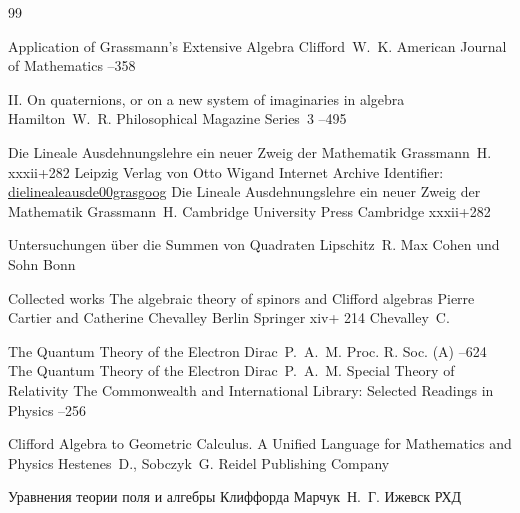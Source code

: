 \begin{thebibliography}{99}

\paper Application of Grassmann's Extensive Algebra
\by    Clifford~W.~K.
\jour American Journal of Mathematics
--358

\paper II. On quaternions, or on a new system of imaginaries in algebra
\by    Hamilton~W.~R.
\jour Philosophical Magazine Series~3
–495

\book  Die Lineale Ausdehnungslehre ein neuer Zweig der Mathematik 
\by    Grassmann~H.
\totalpages xxxii+282
\publaddr Leipzig
\publ Verlag von Otto Wigand
\elink  Internet Archive Identifier: \href{https://archive.org/details/dielinealeausde00grasgoog}{dielinealeausde00grasgoog} 
\moreref
\book  Die Lineale Ausdehnungslehre ein neuer Zweig der Mathematik 
\by    Grassmann~H.
\publ  Cambridge University Press
\publaddr Cambridge
\totalpages xxxii+282



\book Untersuchungen \"uber die Summen von Quadraten
\by    Lipschitz~R.
\publ Max Cohen und Sohn
\publaddr Bonn

\book Collected works
\volinfo The algebraic theory of spinors and Clifford algebras
\eds Pierre Cartier and Catherine Chevalley 
\publaddr Berlin
\publ Springer
\totalpages xiv+ 214 
\by    Chevalley~C.


\paper The Quantum Theory of the Electron
\by    Dirac~P.~A.~M.
\jour Proc. R. Soc. (A)
--624
\moreref
{}
\paper The Quantum Theory of the Electron
\by    Dirac~P.~A.~M.
\inbook Special Theory of Relativity
\serial The Commonwealth and International Library: Selected Readings in Physics
–256


\book  Clifford Algebra to Geometric Calculus. A Unified Language for Mathematics and Physics 
\by    Hestenes~D., Sobczyk~G.
\publaddr Reidel Publishing Company


\book Уравнения теории поля и алгебры Клиффорда
\by    Марчук~Н.~Г.
\publaddr Ижевск
\publ РХД



\end{thebibliography}
